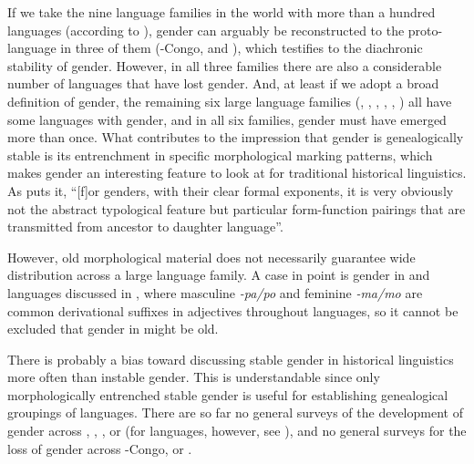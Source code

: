 \documentclass[output=collectionpaper]{langsci/langscibook}
\begin{document}
If we take the nine language families in the world with more than a hundred languages (according to \citealt{Hammarstroem2018}), gender can arguably be reconstructed to the proto-language in three of them (-Congo,  and ), which testifies to the diachronic stability of gender. However, in all three families there are also a considerable number of languages that have lost gender. And, at least if we adopt a broad definition of gender, the remaining six large language families (, , , , , ) all have some languages with gender, and in all six families, gender must have emerged more than once. What contributes to the impression that gender is genealogically stable is its entrenchment in specific morphological marking patterns, which makes gender an interesting feature to look at for traditional historical linguistics. As \cite[303]{Nichols2003} puts it, ``[f]or genders, with their clear formal exponents, it is very obviously not the abstract typological feature but particular form-function pairings that are transmitted from ancestor to daughter language''.

However, old morphological material does not necessarily guarantee wide distribution across a large language family. A case in point is gender in  and  languages discussed in , where masculine \textit{-pa/po} and feminine \textit{-ma/mo} are common derivational suffixes in adjectives throughout  languages, so it cannot be excluded that gender in  might be old.

There is probably a bias toward discussing stable gender in historical linguistics more often than instable gender. This is understandable since only morphologically entrenched stable gender is useful for establishing genealogical groupings of languages. There are so far no general surveys of the development of gender across , , ,  or  (for  languages, however, see \citealt[449--514]{Dixon2002}), and no general surveys for the loss of gender across -Congo,  or .
\end{document}
